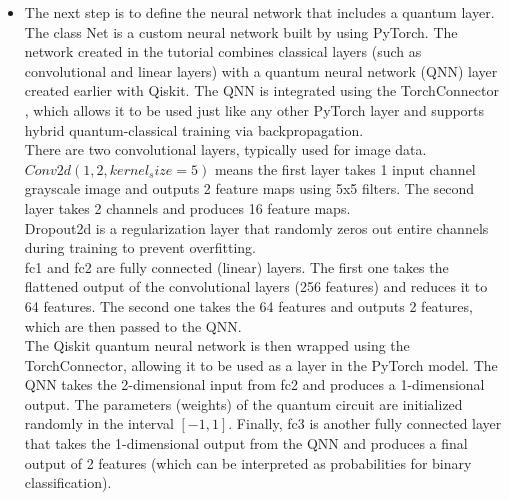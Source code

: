 \documentclass[conference]{IEEEtran}
\begin{document}
\begin{itemize}
{\begin{verbatim}
def create_qnn():
    feature_map = ZZFeatureMap(2)
    ansatz = RealAmplitudes(
        2, reps=1)
    qc = QuantumCircuit(2)
    qc.compose(
        feature_map, inplace=True)
    qc.compose(
        ansatz, inplace=True)

    qnn = EstimatorQNN(
        circuit=qc,
        input_params=
        feature_map.parameters,
        weight_params=
        ansatz.parameters,
        input_gradients=True,
        estimator=estimator,
    )
    return qnn

qnn4 = create_qnn()

\end{verbatim}
}

        \item The next step is to define the neural network that includes a quantum layer.\\

        The class Net \cite{pytorch_net} is a custom neural network built by using PyTorch. 
        The network created in the tutorial combines classical layers (such as convolutional and linear layers) with a quantum neural network (QNN) layer created earlier with Qiskit. 
        The QNN is integrated using the TorchConnector \cite{qiskit_torchconnector}, which allows it to be used just like any other PyTorch layer and supports hybrid quantum-classical training via backpropagation.\\

        There are two convolutional layers, typically used for image data.
        $Conv2d(1, 2, kernel_size=5)$ means the first layer takes 1 input channel grayscale image and outputs 2 feature maps using 5x5 filters. The second layer takes 2 channels and produces 16 feature maps.\\

        Dropout2d \cite{pytorch_dropout2d} is a regularization layer that randomly zeros out entire channels during training to prevent overfitting.\\


        fc1 and fc2 are fully connected (linear) layers. The first one takes the flattened output of the convolutional layers (256 features) and reduces it to 64 features. The second one takes the 64 features and outputs 2 features, which are then passed to the QNN.\\


        The Qiskit quantum neural network is then wrapped using the TorchConnector, allowing it to be used as a layer in the PyTorch model. The QNN takes the 2-dimensional input from fc2 and produces a 1-dimensional output.
        The parameters (weights) of the quantum circuit are initialized randomly in the interval $[-1,1]$.
        Finally, fc3 is another fully connected layer that takes the 1-dimensional output from the QNN and produces a final output of 2 features (which can be interpreted as probabilities for binary classification).


\end{itemize}
\end{document}
